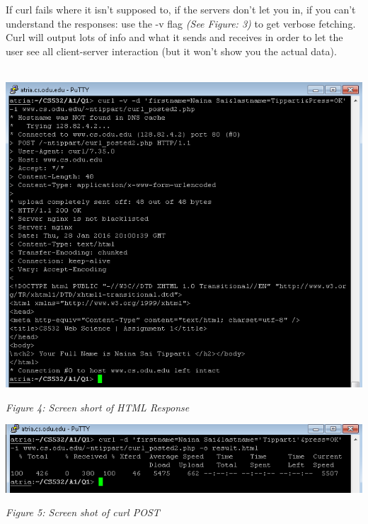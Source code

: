 \newpage
\vspace*{5pt}
If curl fails where it isn't supposed to, if the servers don't let you in,
if you can't understand the responses: use the -v flag \textit{(See Figure: 3)} to get verbose
  fetching. Curl will output lots of info and what it sends and receives in
  order to let the user see all client-server interaction (but it won't show
  you the actual data).\\
  \\
\begin{center}
	\includegraphics[scale=0.85]{Q1/fig5.png}
	\centerline{\textit{Figure 4: Screen short of HTML Response}}
\end{center}
\begin{center}
	\includegraphics[scale=0.85]{Q1/fig3.png}\\
	\centerline{\textit{Figure 5: Screen shot of curl POST}}
\end{center}
\vspace*{5mm}


   
